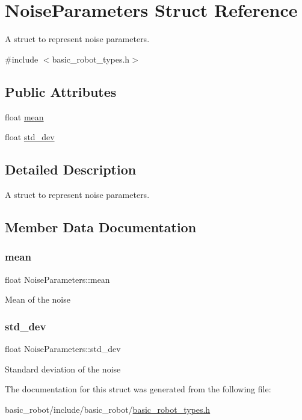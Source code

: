 \hypertarget{structNoiseParameters}{}\section{Noise\+Parameters Struct Reference}
\label{structNoiseParameters}


A struct to represent noise parameters.  




{\ttfamily \#include $<$basic\+\_\+robot\+\_\+types.\+h$>$}

\subsection*{Public Attributes}
\begin{DoxyCompactItemize}
\item 
float \hyperlink{structNoiseParameters_ac51a65e4d895c69eb68d62cabf647b5c}{mean}
\item 
float \hyperlink{structNoiseParameters_a5374d40ef231b5ee1d36a3130766174a}{std\+\_\+dev}
\end{DoxyCompactItemize}


\subsection{Detailed Description}
A struct to represent noise parameters. 

\subsection{Member Data Documentation}
\mbox{\label{structNoiseParameters_ac51a65e4d895c69eb68d62cabf647b5c}} 
\subsubsection{\texorpdfstring{mean}{mean}}
{\footnotesize\ttfamily float Noise\+Parameters\+::mean}

Mean of the noise \mbox{\label{structNoiseParameters_a5374d40ef231b5ee1d36a3130766174a}} 
\subsubsection{\texorpdfstring{std\+\_\+dev}{std\_dev}}
{\footnotesize\ttfamily float Noise\+Parameters\+::std\+\_\+dev}

Standard deviation of the noise 

The documentation for this struct was generated from the following file\+:\begin{DoxyCompactItemize}
\item 
basic\+\_\+robot/include/basic\+\_\+robot/\hyperlink{basic__robot__types_8h}{basic\+\_\+robot\+\_\+types.\+h}\end{DoxyCompactItemize}
